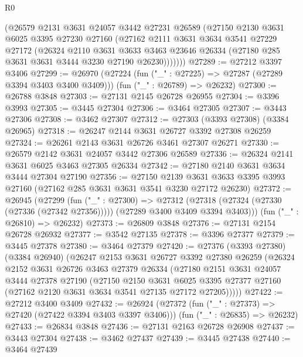 \begin{lexlean}{R0}
\begin{coremodule}
        (@26579
          @2131
          @3631
          @24057
          @3442
          @27231
          @26589
          (@27150
            @2130
            @3631
            @6025
            @3395
            @27230
            @27160
            (@27162
              @2111
              @3631
              @3634
              @3541
              @27229
              @27172
              (@26324
                @2110
                @3631
                @3633
                @3463
                @23646
                @26334
                (@27180 @285 @3631 @3631 @3444 @3230 @27190 @26230)))))))
@27289 := @27212 @3397 @3406
@27299 := @26970
    (@27224 (fun ("_" : @27225) => @27287 (@27289 @3394 @3403 @3400 @3409)))
    (fun ("_" : @26789) => @26232)
@27300 := @26788 @3848
@27303 := @27131 @2145 @26728 @26955
@27304 := @3396 @3993
@27305 := @3445 @27304
@27306 := @3464 @27305
@27307 := @3443 @27306
@27308 := @3462 @27307
@27312 := @27303 (@3393 @27308) (@3384 @26965)
@27318 := @26247 @2144 @3631 @26727 @3392 @27308 @26259
@27324 := @26261 @2143 @3631 @26726 @3461 @27307 @26271
@27330 := @26579 @2142 @3631 @24057 @3442 @27306 @26589
@27336 := @26324 @2141 @3631 @6025 @3463 @27305 @26334
@27342 := @27180 @2140 @3631 @3634 @3444 @27304 @27190
@27356 := @27150
    @2139
    @3631
    @3633
    @3395
    @3993
    @27160
    (@27162 @285 @3631 @3631 @3541 @3230 @27172 @26230)
@27372 := @26945
    (@27299
      (fun ("_" : @27300) =>
      @27312 (@27318 (@27324 (@27330 (@27336 (@27342 @27356))))) (@27289 @3400 @3409 @3394 @3403)))
    (fun ("_" : @26810) => @26232)
@27373 := @26809 @3848
@27376 := @27131 @2154 @26728 @26932
@27377 := @3542 @27135
@27378 := @3396 @27377
@27379 := @3445 @27378
@27380 := @3464 @27379
@27420 := @27376
    (@3393 @27380)
    (@3384 @26940)
    (@26247
      @2153
      @3631
      @26727
      @3392
      @27380
      @26259
      (@26324
        @2152
        @3631
        @26726
        @3463
        @27379
        @26334
        (@27180
          @2151
          @3631
          @24057
          @3444
          @27378
          @27190
          (@27150
            @2150
            @3631
            @6025
            @3395
            @27377
            @27160
            (@27162 @2120 @3631 @3634 @3541 @27135 @27172 @27205)))))
@27422 := @27212 @3400 @3409
@27432 := @26924
    (@27372 (fun ("_" : @27373) => @27420 (@27422 @3394 @3403 @3397 @3406)))
    (fun ("_" : @26835) => @26232)
@27433 := @26834 @3848
@27436 := @27131 @2163 @26728 @26908
@27437 := @3443 @27304
@27438 := @3462 @27437
@27439 := @3445 @27438
@27440 := @3464 @27439

\end{coremodule}
\end{lexlean}
